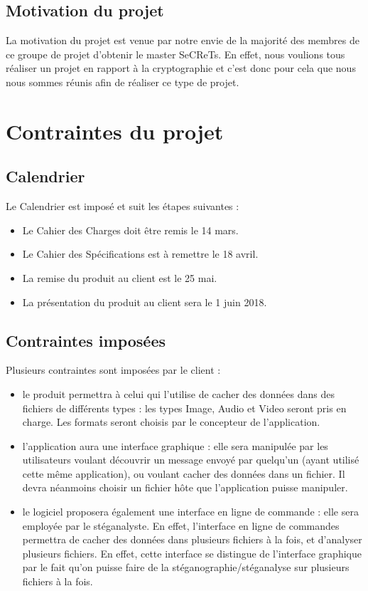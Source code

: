 \documentclass[11pt]{article}
\begin{document}
\subsection{Motivation du projet}

La motivation du projet est venue par notre envie de la majorité des membres de ce groupe de projet d'obtenir le master SeCReTs. 
En effet, nous voulions tous réaliser un projet en rapport à la cryptographie et c'est donc pour cela que nous nous sommes réunis afin de réaliser ce type de projet. 

\section{Contraintes du projet}

\subsection{Calendrier}

Le Calendrier est imposé et suit les étapes suivantes : 

\begin {itemize}
\item Le Cahier des Charges doit être remis le 14 mars. 
\item Le Cahier des Spécifications est à remettre le 18 avril. 
\item La remise du produit au client est le 25 mai. 
\item La présentation du produit au client sera le 1 juin 2018.  
\end{itemize}


\subsection{Contraintes imposées}
Plusieurs contraintes sont imposées par le client : 
\begin{itemize}
\item le produit permettra à celui qui l'utilise de cacher des données dans des fichiers de différents types : les types Image, Audio et Video seront pris en charge. Les formats seront choisis par le concepteur de l'application. 
\item l'application aura une interface graphique : elle sera manipulée par les utilisateurs voulant découvrir un message envoyé par quelqu'un (ayant utilisé cette même application), ou voulant cacher des données dans un fichier. 
Il devra néanmoins choisir un fichier hôte que l'application puisse manipuler. 
\item le logiciel proposera également une interface en ligne de commande : elle sera employée par le stéganalyste. En effet, l'interface en ligne de commandes permettra de cacher des données dans plusieurs fichiers à la fois, et d'analyser plusieurs fichiers. 
En effet, cette interface se distingue de l'interface graphique par le fait qu'on puisse faire de la stéganographie/stéganalyse sur plusieurs fichiers à la fois. 
\end{itemize}
\end{document}
